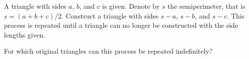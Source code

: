 A triangle with sides $a$, $b$, and $c$ is given.  Denote by $s$ the semiperimeter, that is $s = (a+b+c)/2$.  Construct a triangle with sides $s - a$, $s - b$, and $s - c$.  This process is repeated until a triangle can no longer be constructed with the side lengths given.

For which original triangles can this process be repeated indefinitely?